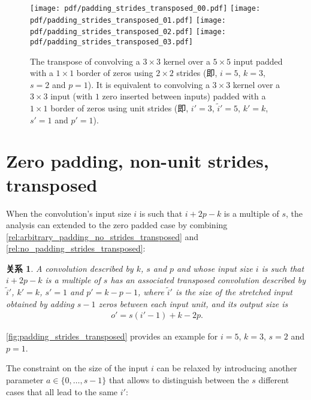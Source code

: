 \documentclass[notitlepage]{ctexrep}
\newtheorem{relationship}{关系}
\begin{document}
\begin{figure}[p]
    \centering
    \texttt{[image: pdf/padding\_strides\_transposed\_00.pdf]}
    \texttt{[image: pdf/padding\_strides\_transposed\_01.pdf]}
    \texttt{[image: pdf/padding\_strides\_transposed\_02.pdf]}
    \texttt{[image: pdf/padding\_strides\_transposed\_03.pdf]}
    \caption{\label{fig:padding_strides_transposed} The transpose of convolving
        a $3 \times 3$ kernel over a $5 \times 5$ input padded with a $1 \times
        1$ border of zeros using $2 \times 2$ strides (即, $i = 5$, $k = 3$, $s
        = 2$ and $p = 1$). It is equivalent to convolving a $3 \times 3$ kernel
        over a $3 \times 3$ input (with $1$ zero inserted between inputs) padded
        with a $1 \times 1$ border of zeros using unit strides (即, $i' = 3$,
        $\tilde{i}' = 5$, $k' = k$, $s' = 1$ and $p' = 1$).}
\end{figure}

\section{Zero padding, non-unit strides, transposed}

When the convolution's input size $i$ is such that $i + 2p - k$ is a multiple
of $s$, the analysis can extended to the zero padded case by combining
\autoref{rel:arbitrary_padding_no_strides_transposed} and
\autoref{rel:no_padding_strides_transposed}:

\begin{relationship}\label{rel:padding_strides_transposed}
A convolution described by $k$, $s$ and $p$ and whose
input size $i$ is such that $i + 2p - k$ is a multiple of $s$ has an associated
transposed convolution described by $\tilde{i}'$, $k' = k$, $s' = 1$ and
$p' = k - p - 1$, where $\tilde{i}'$ is the size of the stretched input
obtained by adding $s - 1$ zeros between each input unit, and its output size
is
\begin{equation*}
\begin{split}
    o' = s (i' - 1) + k - 2p.
\end{split}
\end{equation*}
\end{relationship}

\autoref{fig:padding_strides_transposed} provides an example for $i = 5$, $k =
3$, $s = 2$ and $p = 1$.

The constraint on the size of the input $i$ can be relaxed by introducing
another parameter $a \in \{0, \ldots, s - 1\}$ that allows to distinguish
between the $s$ different cases that all lead to the same $i'$:
\end{document}

